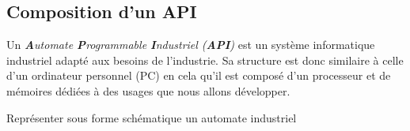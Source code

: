 \subsection{Composition d'un API}
Un \textit{\textbf{A}utomate \textbf{P}rogrammable \textbf{I}ndustriel (\textbf{API})} est un système informatique industriel adapté aux besoins de l'industrie. Sa structure est donc similaire à celle d'un ordinateur personnel (PC) en cela qu'il est composé d'un processeur et de mémoires dédiées à des usages que nous allons développer. 

\begin{UPSTIactivite}
    Représenter sous forme schématique un automate industriel
    \begin{center}
    \end{center}   

\end{UPSTIactivite}



